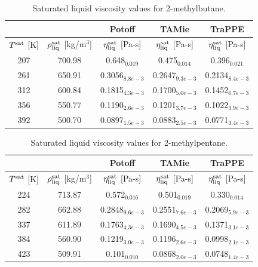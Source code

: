 \documentclass[preprint,review,12pt]{elsarticle}
\begin{document}
	\begin{table}[h!]
		\caption{Saturated liquid viscosity values for 2-methylbutane.}
		\begin{center}
			\begin{tabular}{|c|c|c|c|c|}
				\hline
				&                                       & Potoff            & TAMie             & TraPPE            \\ \hline
				$T^{\rm sat}$ {[}K{]} & $\rho^{\rm sat}_{\rm liq}$ [kg/m$^3$] & $\eta_{\rm liq}^{\rm sat}$ {[}Pa-s{]} & $\eta_{\rm liq}^{\rm sat}$ {[}Pa-s{]} & $\eta_{\rm liq}^{\rm sat}$ {[}Pa-s{]} \\ \hline
				207 & 700.98 & 0.648$_{0.019}$   & 0.475$_{0.014}$   & 0.396$_{0.021}$   \\ \hline
				261 & 650.91 & 0.3056$_{8.8e-3}$ & 0.2647$_{9.3e-3}$ & 0.2134$_{8.4e-3}$ \\ \hline
				312 & 600.84 & 0.1815$_{4.3e-3}$ & 0.1700$_{5.0e-3}$ & 0.1452$_{6.7e-3}$ \\ \hline
				356 & 550.77 & 0.1190$_{2.6e-3}$ & 0.1201$_{3.7e-3}$ & 0.1022$_{3.9e-3}$ \\ \hline
				392 & 500.70 & 0.0897$_{1.5e-3}$ & 0.0883$_{2.5e-3}$ & 0.0771$_{3.4e-3}$ \\ \hline
			\end{tabular}
		\end{center}
	\end{table}
	
	\begin{table}[h!]
		\caption{Saturated liquid viscosity values for 2-methylpentane.}
		\begin{center}
			\begin{tabular}{|c|c|c|c|c|}
				\hline
				&                                       & Potoff            & TAMie             & TraPPE            \\ \hline
				$T^{\rm sat}$ {[}K{]} & $\rho^{\rm sat}_{\rm liq}$ [kg/m$^3$] & $\eta_{\rm liq}^{\rm sat}$ {[}Pa-s{]} & $\eta_{\rm liq}^{\rm sat}$ {[}Pa-s{]} & $\eta_{\rm liq}^{\rm sat}$ {[}Pa-s{]} \\ \hline
				224 & 713.87 & 0.572$_{0.016}$   & 0.501$_{0.019}$   & 0.330$_{0.014}$   \\ \hline
				282 & 662.88 & 0.2848$_{9.6e-3}$ & 0.2551$_{7.6e-3}$ & 0.2069$_{5.9e-3}$ \\ \hline
				337 & 611.89 & 0.1763$_{4.3e-3}$ & 0.1690$_{4.5e-3}$ & 0.1371$_{3.1e-3}$ \\ \hline
				384 & 560.90 & 0.1219$_{3.0e-3}$ & 0.1196$_{2.6e-3}$ & 0.0998$_{2.1e-3}$ \\ \hline
				423 & 509.91 & 0.101$_{0.010}$   & 0.0868$_{2.0e-3}$ & 0.0748$_{1.4e-3}$ \\ \hline
			\end{tabular}
		\end{center}
	\end{table}
	
\end{document}
